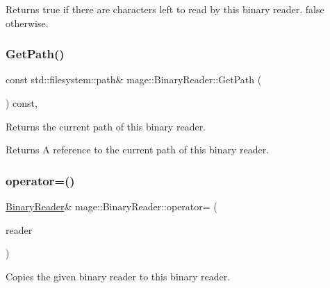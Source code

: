 \begin{DoxyReturn}{Returns}
{\ttfamily true} if there are characters left to read by this binary reader. {\ttfamily false} otherwise. 
\end{DoxyReturn}
\mbox{\label{classmage_1_1_binary_reader_af2c3f4e6a98472a6435dd9d1105b4bc9}} 
\subsubsection{\texorpdfstring{Get\+Path()}{GetPath()}}
{\footnotesize\ttfamily const std\+::filesystem\+::path\& mage\+::\+Binary\+Reader\+::\+Get\+Path (\begin{DoxyParamCaption}{ }\end{DoxyParamCaption}) const\hspace{0.3cm}{\ttfamily [protected]}, {\ttfamily [noexcept]}}

Returns the current path of this binary reader.

\begin{DoxyReturn}{Returns}
A reference to the current path of this binary reader. 
\end{DoxyReturn}
\mbox{\label{classmage_1_1_binary_reader_a0408bb456983b4a03ae42ab69c6f4bc3}} 
\subsubsection{\texorpdfstring{operator=()}{operator=()}\hspace{0.1cm}{\footnotesize\ttfamily [1/2]}}
{\footnotesize\ttfamily \mbox{\hyperlink{classmage_1_1_binary_reader}{Binary\+Reader}}\& mage\+::\+Binary\+Reader\+::operator= (\begin{DoxyParamCaption}\item[{const \mbox{\hyperlink{classmage_1_1_binary_reader}{Binary\+Reader}} \&}]{reader }\end{DoxyParamCaption})\hspace{0.3cm}{\ttfamily [delete]}}

Copies the given binary reader to this binary reader.



